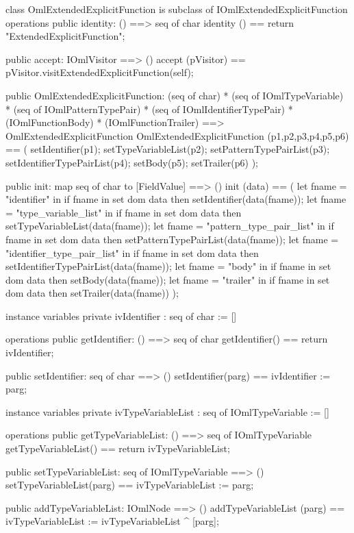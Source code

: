 \begin{vdm_al}
class OmlExtendedExplicitFunction is subclass of IOmlExtendedExplicitFunction
operations
  public identity: () ==> seq of char
  identity () == return "ExtendedExplicitFunction";

  public accept: IOmlVisitor ==> ()
  accept (pVisitor) == pVisitor.visitExtendedExplicitFunction(self);

  public OmlExtendedExplicitFunction:
      (seq of char) *
      (seq of IOmlTypeVariable) *
      (seq of IOmlPatternTypePair) *
      (seq of IOmlIdentifierTypePair) *
      (IOmlFunctionBody) *
      (IOmlFunctionTrailer) ==> OmlExtendedExplicitFunction
  OmlExtendedExplicitFunction (p1,p2,p3,p4,p5,p6) == 
   ( setIdentifier(p1);
     setTypeVariableList(p2);
     setPatternTypePairList(p3);
     setIdentifierTypePairList(p4);
     setBody(p5);
     setTrailer(p6) );

  public init: map seq of char to [FieldValue] ==> ()
  init (data) ==
    ( let fname = "identifier" in
        if fname in set dom data
        then setIdentifier(data(fname));
      let fname = "type_variable_list" in
        if fname in set dom data
        then setTypeVariableList(data(fname));
      let fname = "pattern_type_pair_list" in
        if fname in set dom data
        then setPatternTypePairList(data(fname));
      let fname = "identifier_type_pair_list" in
        if fname in set dom data
        then setIdentifierTypePairList(data(fname));
      let fname = "body" in
        if fname in set dom data
        then setBody(data(fname));
      let fname = "trailer" in
        if fname in set dom data
        then setTrailer(data(fname)) );

instance variables
  private ivIdentifier : seq of char := []

operations
  public getIdentifier: () ==> seq of char
  getIdentifier() == return ivIdentifier;

  public setIdentifier: seq of char ==> ()
  setIdentifier(parg) == ivIdentifier := parg;

instance variables
  private ivTypeVariableList : seq of IOmlTypeVariable := []

operations
  public getTypeVariableList: () ==> seq of IOmlTypeVariable
  getTypeVariableList() == return ivTypeVariableList;

  public setTypeVariableList: seq of IOmlTypeVariable ==> ()
  setTypeVariableList(parg) == ivTypeVariableList := parg;

  public addTypeVariableList: IOmlNode ==> ()
  addTypeVariableList (parg) == ivTypeVariableList := ivTypeVariableList ^ [parg];


\end{vdm_al}

